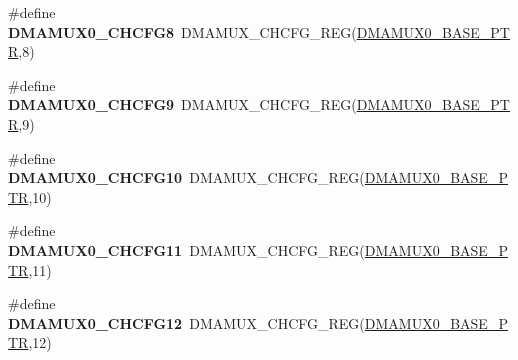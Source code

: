 \begin{DoxyCompactItemize}
\item 
\hypertarget{group___d_m_a_m_u_x___register___accessor___macros_ga2aacea4b73c3b44211b50ebb40215377}{}\#define {\bfseries D\+M\+A\+M\+U\+X0\+\_\+\+C\+H\+C\+F\+G8}~D\+M\+A\+M\+U\+X\+\_\+\+C\+H\+C\+F\+G\+\_\+\+R\+E\+G(\hyperlink{group___d_m_a_m_u_x___peripheral_ga403b61d306820e4e1113c636300004a3}{D\+M\+A\+M\+U\+X0\+\_\+\+B\+A\+S\+E\+\_\+\+P\+T\+R},8)\label{group___d_m_a_m_u_x___register___accessor___macros_ga2aacea4b73c3b44211b50ebb40215377}

\item 
\hypertarget{group___d_m_a_m_u_x___register___accessor___macros_gab06dd3c40da61904c47d8e5706bc8b24}{}\#define {\bfseries D\+M\+A\+M\+U\+X0\+\_\+\+C\+H\+C\+F\+G9}~D\+M\+A\+M\+U\+X\+\_\+\+C\+H\+C\+F\+G\+\_\+\+R\+E\+G(\hyperlink{group___d_m_a_m_u_x___peripheral_ga403b61d306820e4e1113c636300004a3}{D\+M\+A\+M\+U\+X0\+\_\+\+B\+A\+S\+E\+\_\+\+P\+T\+R},9)\label{group___d_m_a_m_u_x___register___accessor___macros_gab06dd3c40da61904c47d8e5706bc8b24}

\item 
\hypertarget{group___d_m_a_m_u_x___register___accessor___macros_gaa4b0b3f7ce312e985aa0548298abbcaf}{}\#define {\bfseries D\+M\+A\+M\+U\+X0\+\_\+\+C\+H\+C\+F\+G10}~D\+M\+A\+M\+U\+X\+\_\+\+C\+H\+C\+F\+G\+\_\+\+R\+E\+G(\hyperlink{group___d_m_a_m_u_x___peripheral_ga403b61d306820e4e1113c636300004a3}{D\+M\+A\+M\+U\+X0\+\_\+\+B\+A\+S\+E\+\_\+\+P\+T\+R},10)\label{group___d_m_a_m_u_x___register___accessor___macros_gaa4b0b3f7ce312e985aa0548298abbcaf}

\item 
\hypertarget{group___d_m_a_m_u_x___register___accessor___macros_ga2f2a379823f99a9a6aad429e22bcb2df}{}\#define {\bfseries D\+M\+A\+M\+U\+X0\+\_\+\+C\+H\+C\+F\+G11}~D\+M\+A\+M\+U\+X\+\_\+\+C\+H\+C\+F\+G\+\_\+\+R\+E\+G(\hyperlink{group___d_m_a_m_u_x___peripheral_ga403b61d306820e4e1113c636300004a3}{D\+M\+A\+M\+U\+X0\+\_\+\+B\+A\+S\+E\+\_\+\+P\+T\+R},11)\label{group___d_m_a_m_u_x___register___accessor___macros_ga2f2a379823f99a9a6aad429e22bcb2df}

\item 
\hypertarget{group___d_m_a_m_u_x___register___accessor___macros_ga56027a5bdc736c05eb15e38878e1beee}{}\#define {\bfseries D\+M\+A\+M\+U\+X0\+\_\+\+C\+H\+C\+F\+G12}~D\+M\+A\+M\+U\+X\+\_\+\+C\+H\+C\+F\+G\+\_\+\+R\+E\+G(\hyperlink{group___d_m_a_m_u_x___peripheral_ga403b61d306820e4e1113c636300004a3}{D\+M\+A\+M\+U\+X0\+\_\+\+B\+A\+S\+E\+\_\+\+P\+T\+R},12)\label{group___d_m_a_m_u_x___register___accessor___macros_ga56027a5bdc736c05eb15e38878e1beee}


\end{DoxyCompactItemize}
